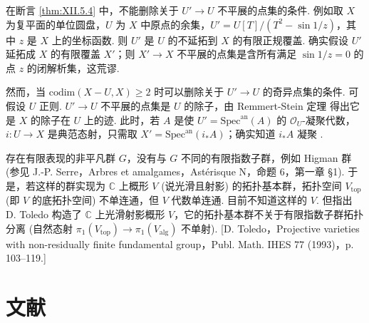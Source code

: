 \begin{remark}\label{rem:XII.5.5}
在断言 \ref{thm:XII.5.4} 中，不能删除关于 $U' \to U$ 不平展的点集的条件. 例如取 $X$ 为复平面的单位圆盘，$U$ 为 $X$ 中原点的余集，$U' = U[T]/(T^2 - \sin 1/z)$，其中 $z$ 是 $X$ 上的坐标函数. 则 $U'$ 是 $U$ 的不延拓到 $X$ 的有限正规覆盖. 确实假设 $U'$ 延拓成 $X$ 的有限覆盖 $X'$；则 $X' \to X$ 不平展的点集是含所有满足 $\sin 1/z = 0$ 的点 $z$ 的闭解析集，这荒谬.

然而，当 $\mathrm{codim}(X - U, X) \geqslant 2$ 时可以删除关于 $U' \to U$ 的奇异点集的条件. 可假设 $U$ 正则. $U' \to U$ 不平展的点集是 $U$ 的除子，由 Remmert-Stein 定理 \cite[定理 3]{exp12-9} 得出它是 $X$ 的除子在 $U$ 上的迹. 此时，若 $A$ 是使 $U' = \mathrm{Spec}^{\mathrm{an}}(A)$ 的 $\mathcal{O}_U$-凝聚代数，$i \colon U \to X$ 是典范态射，只需取 $X' = \mathrm{Spec}^{\mathrm{an}}(i_* A)$；确实知道 $i_* A$ 凝聚 \cite[第 1 号 定理 1]{exp12-11}.

\begin{remark}[2003 年 (MR) 增补]
存在有限表现的非平凡群 $G$，没有与 $G$ 不同的有限指数子群，例如 Higman 群 (参见 J.-P. Serre，Arbres et amalgames，Ast\'erisque N，命题 6，第一章 §1). 于是，若这样的群实现为 $\mathbb{C}$ 上概形 $V$ (说光滑且射影) 的拓扑基本群，拓扑空间 $V_{\mathrm{top}}$ (即 $V$ 的底拓扑空间) 不单连通，但 $V$ 代数单连通. 目前不知道这样的 $V$. 但指出 D. Toledo 构造了 $\mathbb{C}$ 上光滑射影概形 $V$，它的拓扑基本群不关于有限指数子群拓扑分离 (自然态射 $\pi_1(V_{\mathrm{top}}) \to \pi_1(V_{\mathrm{alg}})$ 不单射). [D. Toledo，Projective varieties with non-residually finite fundamental group，Publ. Math. IHES 77 (1993)，p. 103--119.]
\end{remark}
\end{remark}

\section{文献}\printbibliography[heading=none]


